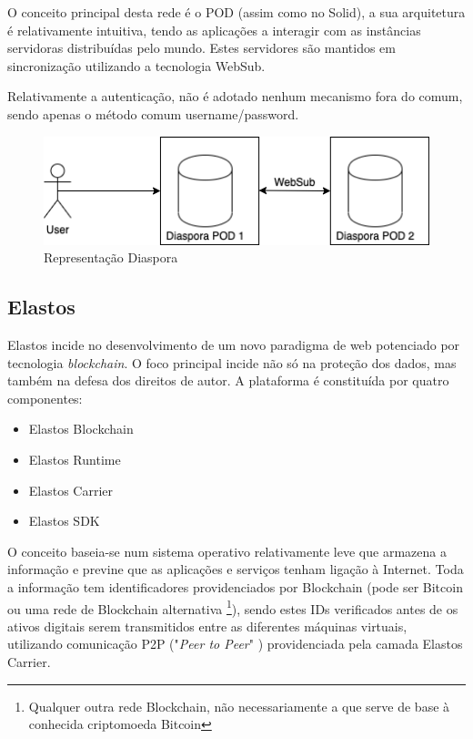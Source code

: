 O conceito principal desta rede é o POD (assim como no Solid), a sua arquitetura é relativamente intuitiva, tendo as aplicações a interagir com as instâncias servidoras distribuídas pelo mundo. Estes servidores são mantidos em sincronização utilizando a tecnologia WebSub. \cite{diaspora_wiki}

Relativamente a autenticação, não é adotado nenhum mecanismo fora do comum, sendo apenas o método comum username/password.

\begin{figure}[H]
    \begin{center}
    \includegraphics[width=1\textwidth]{figures/estado_arte-Diaspora.png}
    \caption{Representação Diaspora}
    \end{center}
\end{figure}

\subsection{Elastos}
Elastos incide no desenvolvimento de um novo paradigma de web potenciado por tecnologia \emph{blockchain}\cite{a_bit_about_blockchain}. O foco principal incide não só na proteção dos dados, mas também na defesa dos direitos de autor. A plataforma é constituída por quatro componentes:\cite{elastos_white_paper}
\begin{itemize}
	\item Elastos Blockchain
	\item Elastos Runtime
	\item Elastos Carrier
	\item Elastos SDK
\end{itemize}

O conceito baseia-se num sistema operativo relativamente leve que armazena a informação e previne que as aplicações e serviços tenham ligação à Internet. Toda a informação tem identificadores providenciados por Blockchain (pode ser Bitcoin ou uma rede de Blockchain alternativa \footnote{Qualquer outra rede Blockchain, não necessariamente a que serve de base à conhecida criptomoeda Bitcoin}), sendo estes IDs verificados antes de os ativos digitais serem transmitidos entre as diferentes máquinas virtuais, utilizando comunicação P2P ("\emph{Peer to Peer}" \label{sym:P2P})\cite{what_are_P2P_networks} providenciada pela camada Elastos Carrier.\cite{elastos_developer}

